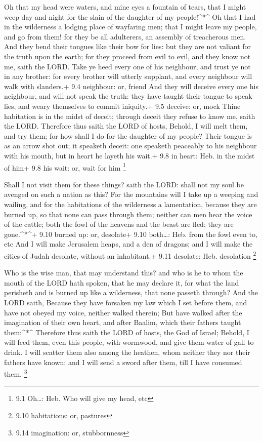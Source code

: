  Oh that my head were waters, and mine eyes a fountain of
tears, that I might weep day and night for the slain of the daughter of
my people!\^{}*\^{}  Oh that I had in the wilderness a
lodging place of wayfaring men; that I might leave my people, and go
from them! for they be all adulterers, an assembly of treacherous men.
 And they bend their tongues like their bow for lies: but
they are not valiant for the truth upon the earth; for they proceed from
evil to evil, and they know not me, saith the LORD.  Take ye
heed every one of his neighbour, and trust ye not in any brother: for
every brother will utterly supplant, and every neighbour will walk with
slanders.+ 9.4 neighbour: or, friend  And they will deceive
every one his neighbour, and will not speak the truth: they have taught
their tongue to speak lies, and weary themselves to commit iniquity.+
9.5 deceive: or, mock  Thine habitation is in the midst of
deceit; through deceit they refuse to know me, saith the LORD.
 Therefore thus saith the LORD of hosts, Behold, I will melt
them, and try them; for how shall I do for the daughter of my people?
 Their tongue is as an arrow shot out; it speaketh deceit:
one speaketh peaceably to his neighbour with his mouth, but in heart he
layeth his wait.+ 9.8 in heart: Heb. in the midst of him+ 9.8 his wait:
or, wait for him \footnote{9.1 Oh\ldots: Heb. Who will give my head, etc}

 Shall I not visit them for these things? saith the LORD:
shall not my soul be avenged on such a nation as this?  For
the mountains will I take up a weeping and wailing, and for the
habitations of the wilderness a lamentation, because they are burned up,
so that none can pass through them; neither can men hear the voice of
the cattle; both the fowl of the heavens and the beast are fled; they
are gone.\^{}*\^{}+ 9.10 burned up: or, desolate+ 9.10 both\ldots: Heb.
from the fowl even to, etc  And I will make Jerusalem
heaps, and a den of dragons; and I will make the cities of Judah
desolate, without an inhabitant.+ 9.11 desolate: Heb. desolation
\footnote{9.10 habitations: or, pastures}

 Who is the wise man, that may understand this? and who is
he to whom the mouth of the LORD hath spoken, that he may declare it,
for what the land perisheth and is burned up like a wilderness, that
none passeth through?  And the LORD saith, Because they
have forsaken my law which I set before them, and have not obeyed my
voice, neither walked therein;  But have walked after the
imagination of their own heart, and after Baalim, which their fathers
taught them:\^{}*\^{}  Therefore thus saith the LORD of
hosts, the God of Israel; Behold, I will feed them, even this people,
with wormwood, and give them water of gall to drink.  I
will scatter them also among the heathen, whom neither they nor their
fathers have known: and I will send a sword after them, till I have
consumed them. \footnote{9.14 imagination: or, stubbornness}

